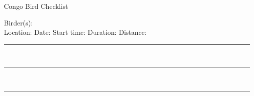 \documentclass{article}
\newcommand{\newnoteline}{\rule{\textwidth}{0.15mm}\\[1.5ex]}
\begin{document}
\centering
\LARGE{Congo Bird Checklist}\\
\normalsize \raggedright


Birder(s): \underline{\hspace{112ex}}\\[1.5ex]
Location: \underline{\hspace{28ex}}    Date: \underline{\hspace{13ex}}    Start time: \underline{\hspace{10ex}}   Duration: \underline{\hspace{10ex}}    Distance: \underline{\hspace{10ex}}\\[1.5ex]


\newnoteline\newnoteline\newnoteline


\begin{center}


\end{center}
\end{document}
